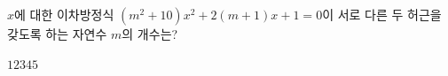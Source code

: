 $x$에 대한 이차방정식 $(m^2+10)x^2+2(m+1)x+1=0$이 서로 다른 두 허근을 갖도록 하는 자연수 $m$의 개수는?
\begin{choices32}{$1$}{$2$}{$3$}{$4$}{$5$}\end{choices32}
